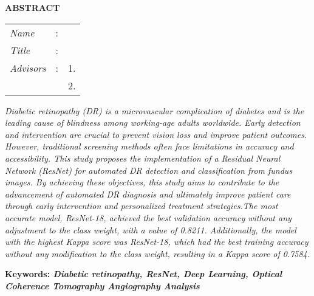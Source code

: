 \begin{center}
  \large\textbf{ABSTRACT}
\end{center}


\vspace{2ex}

\begingroup
\setlength{\tabcolsep}{0pt}

\noindent
\begin{tabularx}{\textwidth}{l >{\centering}m{3em} X}
  \emph{Name}     & : & \name{}         \\

  \emph{Title}    & : & \engtatitle{}   \\

  \emph{Advisors} & : & 1. \advisor{}   \\
                  &   & 2. \coadvisor{} \\
\end{tabularx}
\endgroup

\emph{Diabetic retinopathy (DR) is a microvascular complication of diabetes and is the leading cause of blindness among working-age adults worldwide. Early detection and intervention are crucial to prevent vision loss and improve patient outcomes. However, traditional screening methods often face limitations in accuracy and accessibility. This study proposes the implementation of a Residual Neural Network (ResNet) for automated DR detection and classification from fundus images. By achieving these objectives, this study aims to contribute to the advancement of automated DR diagnosis and ultimately improve patient care through early intervention and personalized treatment strategies.The most accurate model, ResNet-18, achieved the best validation accuracy without any adjustment to the class weight, with a value of 0.8211. Additionally, the model with the highest Kappa score was ResNet-18, which had the best training accuracy without any modification to the class weight, resulting in a Kappa score of 0.7584.}

\textbf{Keywords: \emph{Diabetic retinopathy, ResNet, Deep Learning, Optical Coherence Tomography Angiography Analysis}}